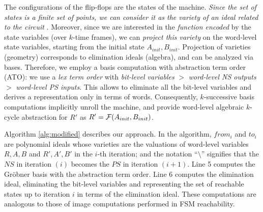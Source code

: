 The configurations of the flip-flops are the states of the
machine. {\it Since the set of states is a finite set of points, we
can consider it as the variety of an ideal related to the circuit
}. Moreover, since we are interested in
the {\it function encoded} by the state variables (over $k$-time
frames), we can {\it project this variety} on the word-level state
variables, starting from the initial state $A_{init}, B_{init}$.
Projection of varieties (geometry) corresponds to elimination ideals
(algebra), and can be analyzed via \Grobner bases. Therefore, we
employ a \Grobner basis computation with abstraction term order (ATO)\cite{timDAC}: we use a {\it lex term
  order} with {\it bit-level variables} 
$>$ {\it word-level NS outputs} $>$ {\it word-level PS inputs}. This
allows to eliminate all the bit-level variables 
and derives a representation only in terms of words. 
Consequently, $k$-successive \Grobner basis computations implicitly
unroll the machine, and provide word-level algebraic $k$-cycle
abstraction for $R'$ as $R' = {\mathcal{F}}(A_{init}, B_{init})$. 

Algorithm
\ref{alg:modified} describes our approach.  In the algorithm, $from_i$
and $to_i$ are polynomial ideals whose varieties are the valuations of
word-level variables $R, A, B$ and $R',A',B'$ in the $i$-th iteration;
and the notation ``$\setminus$'' signifies that the $NS$ in iteration
$(i)$ becomes the $PS$ in iteration $(i+1)$. Line 5 computes the Gr\"obner 
basis with the abstraction term order.  Line 6 computes the elimination 
ideal, eliminating the bit-level variables and representing the set of 
reachable states up to iteration $i$ in terms of the elimination ideal. 
These computations are analogous to those of image computations performed in FSM reachability. 

